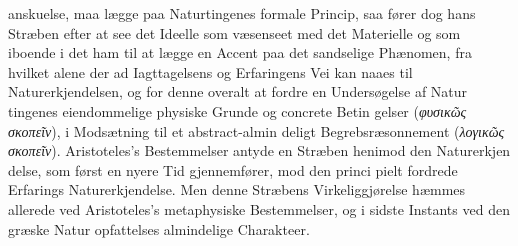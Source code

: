 \documentclass[12pt,a4paper]{book}
\newcommand{\gk}[1]{\textit{#1}}
\begin{document}
anskuelse, maa lægge paa Naturtingenes formale Princip, saa
fører dog hans Stræben efter at see det Ideelle som væsenseet
med det Materielle og som iboende i det ham til at lægge en
Accent paa det sandselige Phænomen, fra hvilket alene der ad
Iagttagelsens og Erfaringens Vei kan naaes til Naturerkjendelsen,
og for denne overalt at fordre en Undersøgelse af Natur\-%
tingenes eiendommelige physiske Grunde og concrete Betin\-%
gelser (\gk{φυσικῶς σκοπεῖν}), i Modsætning til et abstract-almin\-%
deligt Begrebsræsonnement (\gk{λογικῶς σκοπεῖν}). Aristoteles's
Bestemmelser antyde en Stræben henimod den Naturerkjen\-%
delse, som først en nyere Tid gjennemfører, mod den princi\-%
pielt fordrede Erfarings Naturerkjendelse. Men denne Stræbens
Virkeliggjørelse hæmmes allerede ved Aristoteles's metaphysiske
Bestemmelser, og i sidste Instants ved den græske Natur\-%
opfattelses almindelige Charakteer.
\end{document}
